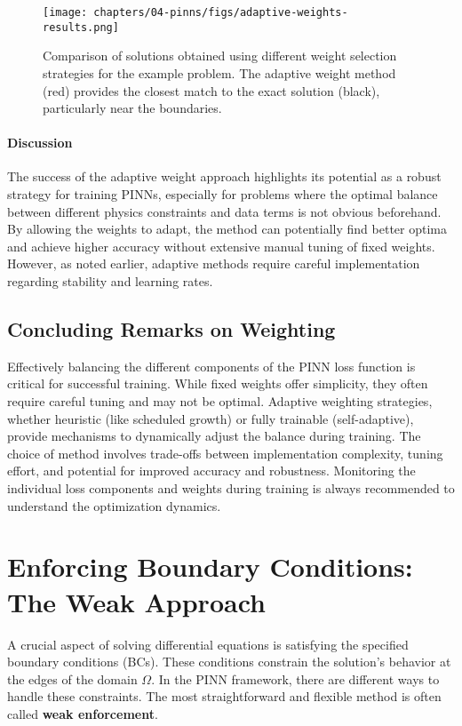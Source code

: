\begin{figure}[htbp]
    \centering
    \texttt{[image: chapters/04-pinns/figs/adaptive-weights-results.png]} %
    \caption{Comparison of solutions obtained using different weight selection strategies for the example problem. The adaptive weight method (red) provides the closest match to the exact solution (black), particularly near the boundaries.}
    \label{fig:results_adaptive_weights}
\end{figure}

\paragraph{Discussion}
The success of the adaptive weight approach highlights its potential as a robust strategy for training PINNs, especially for problems where the optimal balance between different physics constraints and data terms is not obvious beforehand. By allowing the weights to adapt, the method can potentially find better optima and achieve higher accuracy without extensive manual tuning of fixed weights. However, as noted earlier, adaptive methods require careful implementation regarding stability and learning rates.

\subsection{Concluding Remarks on Weighting}

Effectively balancing the different components of the PINN loss function is critical for successful training. While fixed weights offer simplicity, they often require careful tuning and may not be optimal. Adaptive weighting strategies, whether heuristic (like scheduled growth) or fully trainable (self-adaptive), provide mechanisms to dynamically adjust the balance during training. The choice of method involves trade-offs between implementation complexity, tuning effort, and potential for improved accuracy and robustness. Monitoring the individual loss components and weights during training is always recommended to understand the optimization dynamics.

\section{Enforcing Boundary Conditions: The Weak Approach}
\label{sec:weak_bc}

A crucial aspect of solving differential equations is satisfying the specified boundary conditions (BCs). These conditions constrain the solution's behavior at the edges of the domain $\Omega$. In the PINN framework, there are different ways to handle these constraints. The most straightforward and flexible method is often called \textbf{weak enforcement}.

